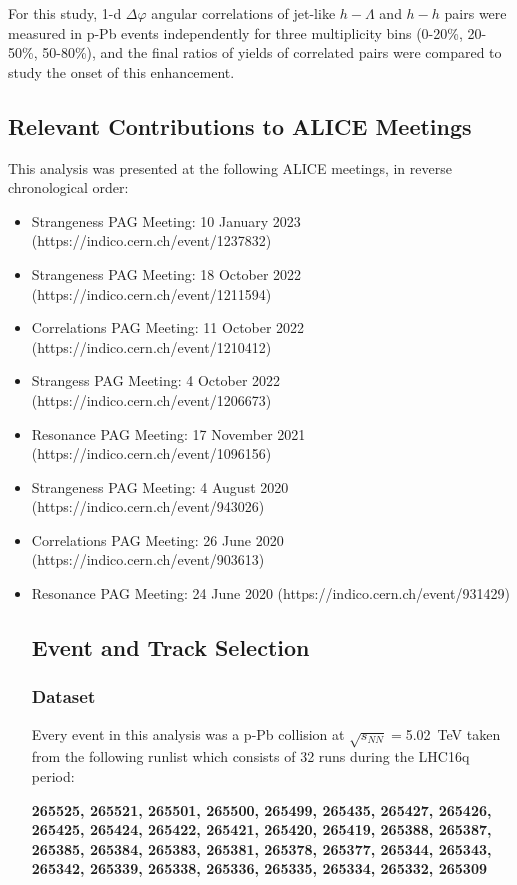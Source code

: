 \documentclass[ALICE,manyauthors]{ALICE_analysis_notes}
\begin{document}
For this study, 1-d $\Delta\varphi$ angular correlations of jet-like $h-\Lambda$ and $h-h$ pairs were measured in p-Pb events independently for three multiplicity bins (0-20\%, 20-50\%, 50-80\%), and the final ratios of yields of correlated pairs were compared to study the onset of this enhancement. 


\subsection{Relevant Contributions to ALICE Meetings}
This analysis was presented at the following ALICE meetings, in reverse chronological order:


\begin{itemize}
\item Strangeness PAG Meeting: 10 January 2023 (https://indico.cern.ch/event/1237832)
\item Strangeness PAG Meeting: 18 October 2022 (https://indico.cern.ch/event/1211594)
\item Correlations PAG Meeting: 11 October 2022 (https://indico.cern.ch/event/1210412)
\item Strangess PAG Meeting: 4 October 2022 (https://indico.cern.ch/event/1206673)
\item Resonance PAG Meeting: 17 November 2021 (https://indico.cern.ch/event/1096156)
\item Strangeness PAG Meeting: 4 August 2020 (https://indico.cern.ch/event/943026)
\item Correlations PAG Meeting: 26 June 2020 (https://indico.cern.ch/event/903613)
\item Resonance PAG Meeting: 24 June 2020 (https://indico.cern.ch/event/931429)

\subsection{Event and Track Selection}

\subsubsection{Dataset}

Every event in this analysis was a p-Pb collision at $\sqrt{s_{NN}} =$\SI{5.02}{TeV} taken from the following runlist which consists of 32 runs during the LHC16q period:

\textbf{265525, 265521, 265501, 265500, 265499, 265435, 265427, 265426, 265425, 265424, 265422, 265421, 265420, 265419, 265388, 265387, 265385, 265384, 265383, 265381, 265378, 265377, 265344, 265343, 265342, 265339, 265338, 265336, 265335, 265334, 265332, 265309}



\end{itemize}
\end{document}
